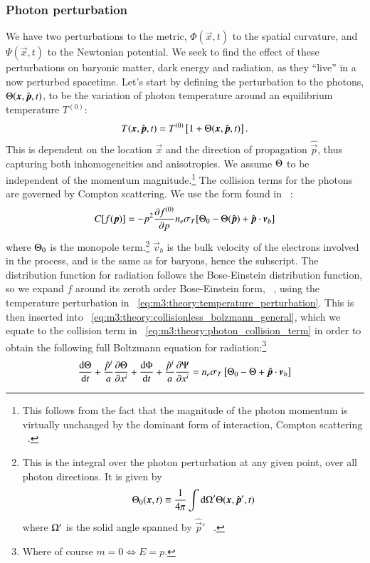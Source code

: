 \subsubsection{Photon perturbation}
    We have two perturbations to the metric, $\Phi(\vec{x}, t)$ to the spatial curvature, and $\Psi(\vec{x},t)$ to the Newtonian potential. We seek to find the effect of these perturbations on baryonic matter, dark energy and radiation, as they ``live'' in a now perturbed spacetime. Let's start by defining the perturbation to the photons, $\Theta(\boldsymbol{x}, \hat{\boldsymbol{p}}, t)$, to be the variation of photon temperature around an equilibrium temperature $T^{(0)}$:
    \begin{equation}\label{eq:m3:theory:temperature_perturbation}
        T(\boldsymbol{x}, \hat{\boldsymbol{p}}, t) = T^{(0)}\left[1+\Theta(\boldsymbol{x}, \hat{\boldsymbol{p}}, t)\right].
    \end{equation}
    This is dependent on the location $\vec{x}$ and the direction of propagation $\hat{\vec{p}}$, thus capturing both inhomogeneities and anisotropies. We assume $\Theta$ to be independent of the momentum magnitude.\footnote{This follows from the fact that the magnitude of the photon momentum is virtually unchanged by the dominant form of interaction, Compton scattering ~\cite{dodelson2020modern}.}
    The collision terms for the photons are governed by Compton scattering. We use the form found in ~\cite[Eq. 5.22]{dodelson2020modern}:
    \begin{equation}\label{eq:m3:theory:photon_collision_term}
        C[f(\boldsymbol{p})] = -p^2\pdv{f^{(0)}}{p}n_e\sigma_T[\Theta_0 - \Theta(\hat{\boldsymbol{p}}) + \hat{\boldsymbol{p}}\cdot\boldsymbol{v}_b]
    \end{equation}
    where $\Theta_0$ is the monopole term.\footnote{This is the integral over the photon perturbation at any given point, over all photon directions. It is given by $$\Theta_0(\boldsymbol{x}, t) \equiv \frac{1}{4\pi}\int \mathrm{d}\Omega'\Theta(\boldsymbol{x}, \hat{\boldsymbol{p}}', t)$$ where $\Omega'$ is the solid angle spanned by $\hat{\vec{p}}'$ ~\cite{dodelson2020modern}.} $\vec{v}_b$ is the bulk velocity of the electrons involved in the process, and is the same as for baryons, hence the subscript. The distribution function for radiation follows the Bose-Einstein distribution function, so we expand $f$ around its zeroth order Bose-Einstein form, ~\cite[Eq. 5.2-5.9]{dodelson2020modern}, using the temperature perturbation in ~\cref{eq:m3:theory:temperature_perturbation}. This is then inserted into ~\cref{eq:m3:theory:collisionless_bolzmann_general}, which we equate to the collision term in ~\cref{eq:m3:theory:photon_collision_term} in order to obtain the following full Boltzmann equation for radiation:\footnote{Where of course $m=0\iff E=p$.}
    \begin{equation}\label{eq:m3:theory:boltzmann_equation_radiation_full}
        \dv{\Theta}{t} + \frac{\hat{p}^i}{a}\pdv{\Theta}{x^i} + \dv{\Phi}{t} + \frac{\hat{p}^i}{a}\pdv{\Psi}{x^i} = n_e\sigma_T\left[\Theta_0-\Theta+\boldsymbol{\hat{p}}\cdot\boldsymbol{v}_b\right]
    \end{equation} 

